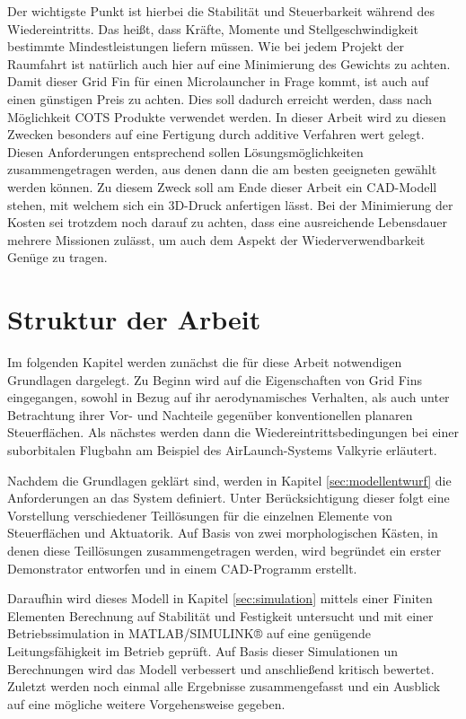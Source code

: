 Der wichtigste Punkt ist hierbei die Stabilität und Steuerbarkeit während des Wiedereintritts. Das heißt, dass Kräfte, Momente und Stellgeschwindigkeit bestimmte Mindestleistungen liefern müssen. Wie bei jedem Projekt der Raumfahrt ist natürlich auch hier auf eine Minimierung des Gewichts zu achten. Damit dieser Grid Fin für einen Microlauncher in Frage kommt, ist auch auf einen günstigen Preis zu achten. Dies soll dadurch erreicht werden, dass nach Möglichkeit \gls{COTS} Produkte verwendet werden. In dieser Arbeit wird zu diesen Zwecken besonders auf eine Fertigung durch additive Verfahren wert gelegt.
Diesen Anforderungen entsprechend sollen Lösungsmöglichkeiten zusammengetragen werden, aus denen dann die am besten geeigneten gewählt werden können. Zu diesem Zweck soll am Ende dieser Arbeit ein CAD-Modell stehen, mit welchem sich ein 3D-Druck anfertigen lässt. Bei der Minimierung der Kosten sei trotzdem noch darauf zu achten, dass eine ausreichende Lebensdauer mehrere Missionen zulässt, um auch dem Aspekt der Wiederverwendbarkeit Genüge zu tragen.

\section{Struktur der Arbeit}
Im folgenden Kapitel werden zunächst die für diese Arbeit notwendigen Grundlagen dargelegt. Zu Beginn wird auf die Eigenschaften von Grid Fins eingegangen, sowohl in Bezug auf ihr aerodynamisches Verhalten, als auch unter Betrachtung ihrer Vor- und Nachteile gegenüber konventionellen planaren Steuerflächen. Als nächstes werden dann die Wiedereintrittsbedingungen bei einer suborbitalen Flugbahn am Beispiel des AirLaunch-Systems Valkyrie erläutert.

Nachdem die Grundlagen geklärt sind, werden in Kapitel \ref{sec:modellentwurf} die Anforderungen an das System definiert. Unter Berücksichtigung dieser folgt eine Vorstellung verschiedener Teillösungen für die einzelnen Elemente von Steuerflächen und Aktuatorik. Auf Basis von zwei morphologischen Kästen, in denen diese Teillösungen zusammengetragen werden, wird begründet ein erster Demonstrator entworfen und in einem CAD-Programm erstellt.

Daraufhin wird dieses Modell in Kapitel \ref{sec:simulation} mittels einer Finiten Elementen Berechnung auf Stabilität und Festigkeit untersucht und mit einer Betriebssimulation in MATLAB/SIMULINK® auf eine genügende
Leitungsfähigkeit im Betrieb geprüft. Auf Basis dieser Simulationen un Berechnungen wird das Modell verbessert und anschließend kritisch bewertet.
Zuletzt werden noch einmal alle Ergebnisse zusammengefasst und ein Ausblick auf eine mögliche weitere Vorgehensweise gegeben.